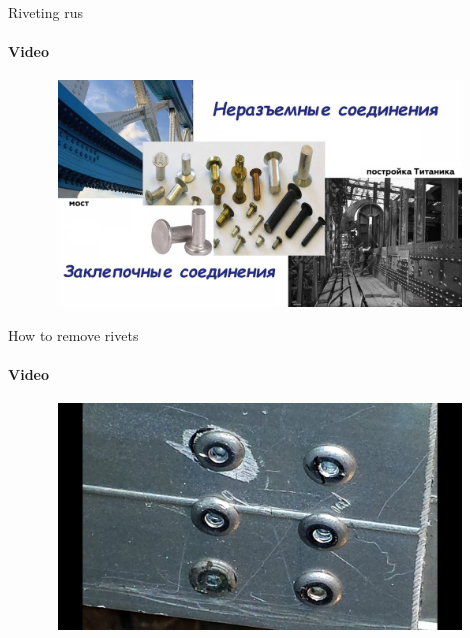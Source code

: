 \documentclass[aspectratio=169]{beamer}
\begin{document}
\begin{frame}[t]{Riveting rus}
    \framesubtitle{Video}
    \vspace{-0.6cm}
    \begin{figure}[H]
        \href{https://youtu.be/H7ssVv_MtNQ}{
            \centering\includegraphics[height=6cm,width=1\textwidth,keepaspectratio]{riveting_rus_video.jpg}}
        \label{fig:riveting_rus_video.jpg}
    \end{figure}
\end{frame}

\begin{frame}[t]{How to remove rivets}
    \framesubtitle{Video}
    \vspace{-0.6cm}
    \begin{figure}[H]
        \href{https://youtu.be/uG5plvIy3wk}{
            \centering\includegraphics[height=6cm,width=1\textwidth,keepaspectratio]{rivets_umount_video.jpg}}
        \label{fig:rivets_umount_video.jpg}
    \end{figure}
\end{frame}
\end{document}

